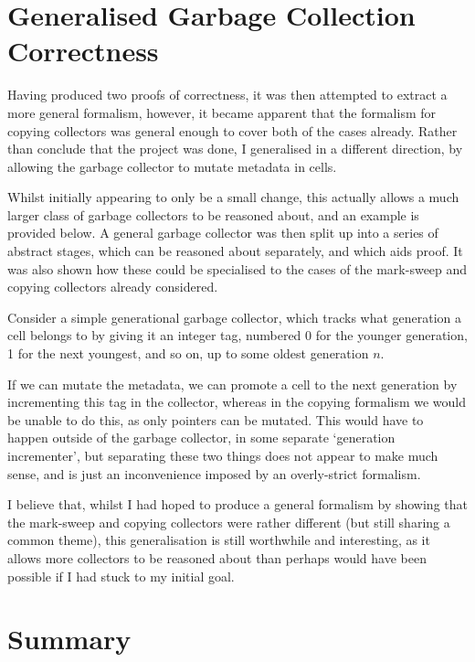 \section{Generalised Garbage Collection Correctness}
\label{sec:results-correctness}

Having produced two proofs of correctness, it was then attempted to
extract a more general formalism, however, it became apparent that the
formalism for copying collectors was general enough to cover both of
the cases already. Rather than conclude that the project was done, I
generalised in a different direction, by allowing the garbage
collector to mutate metadata in cells.

Whilst initially appearing to only be a small change, this actually
allows a much larger class of garbage collectors to be reasoned about,
and an example is provided below. A general garbage collector was then
split up into a series of abstract stages, which can be reasoned about
separately, and which aids proof. It was also shown how these could be
specialised to the cases of the mark-sweep and copying collectors
already considered.

\begin{example}
  Consider a simple generational garbage collector, which tracks what
  generation a cell belongs to by giving it an integer tag, numbered 0
  for the younger generation, 1 for the next youngest, and so on, up
  to some oldest generation $n$.

  If we can mutate the metadata, we can promote a cell to the next
  generation by incrementing this tag in the collector, whereas in the
  copying formalism we would be unable to do this, as only pointers
  can be mutated. This would have to happen outside of the garbage
  collector, in some separate `generation incrementer', but
  separating these two things does not appear to make much sense, and
  is just an inconvenience imposed by an overly-strict formalism.
\end{example}

I believe that, whilst I had hoped to produce a general formalism by
showing that the mark-sweep and copying collectors were rather
different (but still sharing a common theme), this generalisation is
still worthwhile and interesting, as it allows more collectors to be
reasoned about than perhaps would have been possible if I had stuck to
my initial goal.

\section{Summary}
\label{sec:results-summary}

